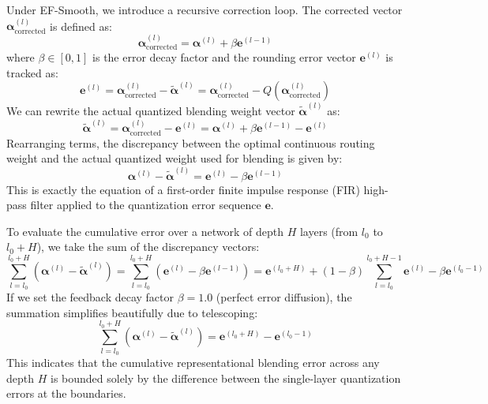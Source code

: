 \documentclass{article}
\theoremstyle{plain}
\theoremstyle{definition}
\theoremstyle{remark}
\begin{document}
Under EF-Smooth, we introduce a recursive correction loop. The corrected vector $\boldsymbol{\alpha}_{\text{corrected}}^{(l)}$ is defined as:
\begin{equation}
    \boldsymbol{\alpha}_{\text{corrected}}^{(l)} = \boldsymbol{\alpha}^{(l)} + \beta \mathbf{e}^{(l-1)}
\end{equation}
where $\beta \in [0, 1]$ is the error decay factor and the rounding error vector $\mathbf{e}^{(l)}$ is tracked as:
\begin{equation}
    \mathbf{e}^{(l)} = \boldsymbol{\alpha}_{\text{corrected}}^{(l)} - \tilde{\boldsymbol{\alpha}}^{(l)} = \boldsymbol{\alpha}_{\text{corrected}}^{(l)} - Q\left(\boldsymbol{\alpha}_{\text{corrected}}^{(l)}\right)
\end{equation}
We can rewrite the actual quantized blending weight vector $\tilde{\boldsymbol{\alpha}}^{(l)}$ as:
\begin{equation}
    \tilde{\boldsymbol{\alpha}}^{(l)} = \boldsymbol{\alpha}_{\text{corrected}}^{(l)} - \mathbf{e}^{(l)} = \boldsymbol{\alpha}^{(l)} + \beta \mathbf{e}^{(l-1)} - \mathbf{e}^{(l)}
\end{equation}
Rearranging terms, the discrepancy between the optimal continuous routing weight and the actual quantized weight used for blending is given by:
\begin{equation}
    \boldsymbol{\alpha}^{(l)} - \tilde{\boldsymbol{\alpha}}^{(l)} = \mathbf{e}^{(l)} - \beta \mathbf{e}^{(l-1)}
\end{equation}
This is exactly the equation of a first-order finite impulse response (FIR) high-pass filter applied to the quantization error sequence $\mathbf{e}$.

To evaluate the cumulative error over a network of depth $H$ layers (from $l_0$ to $l_0 + H$), we take the sum of the discrepancy vectors:
\begin{equation}
    \sum_{l=l_0}^{l_0+H} \left( \boldsymbol{\alpha}^{(l)} - \tilde{\boldsymbol{\alpha}}^{(l)} \right) = \sum_{l=l_0}^{l_0+H} \left( \mathbf{e}^{(l)} - \beta \mathbf{e}^{(l-1)} \right) = \mathbf{e}^{(l_0+H)} + (1-\beta) \sum_{l=l_0}^{l_0+H-1} \mathbf{e}^{(l)} - \beta \mathbf{e}^{(l_0-1)}
\end{equation}
If we set the feedback decay factor $\beta = 1.0$ (perfect error diffusion), the summation simplifies beautifully due to telescoping:
\begin{equation}
    \sum_{l=l_0}^{l_0+H} \left( \boldsymbol{\alpha}^{(l)} - \tilde{\boldsymbol{\alpha}}^{(l)} \right) = \mathbf{e}^{(l_0+H)} - \mathbf{e}^{(l_0-1)}
\end{equation}
This indicates that the cumulative representational blending error across any depth $H$ is bounded solely by the difference between the single-layer quantization errors at the boundaries.
\end{document}
